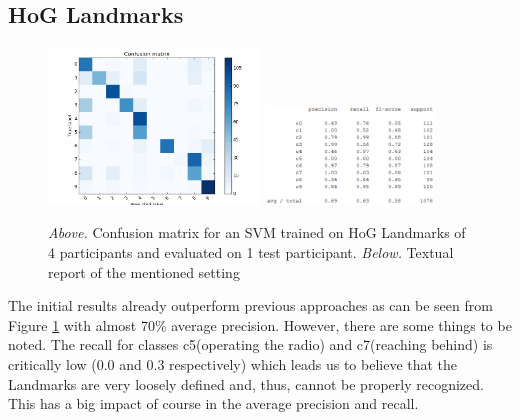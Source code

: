 \documentclass[10pt,twocolumn,letterpaper]{article}
\begin{document}
\subsection{HoG Landmarks}
\begin{figure}[h]
	\centering
	\includegraphics[width=0.5\textwidth]{mult_HOG/4c0123456789matComparable}
	\includegraphics[width=0.4\textwidth]{mult_HOG/4c0123456789repComparable}
	\caption{\textit{Above.} Confusion matrix for an SVM trained on HoG Landmarks of 4 participants and evaluated on 1 test participant. \textit{Below.} Textual report of the mentioned setting}
	\label{Landmarks_4all}
\end{figure}

The initial results already outperform previous approaches as can be seen from Figure \ref{Landmarks_4all}  with almost 70\% average precision. However, there are some things to be noted. The recall for classes c5(operating the radio) and c7(reaching behind) is critically low (0.0 and 0.3 respectively) which leads us to believe that the Landmarks are very loosely defined and, thus, cannot be properly recognized. This has a big impact of course in the average precision and recall. 
\end{document}

